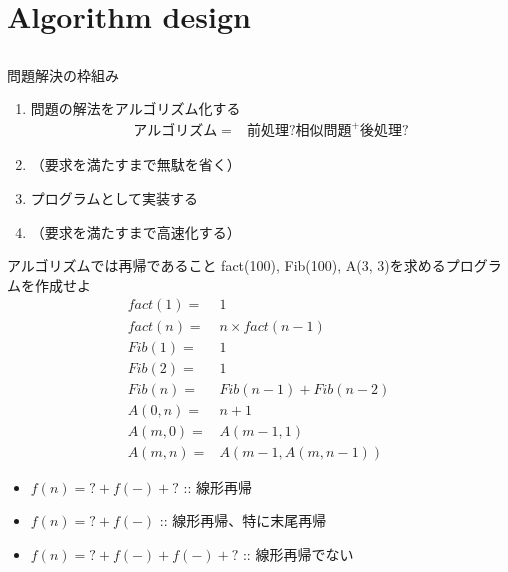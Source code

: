 \documentclass{beamer}
\subtitle{練習問題}
\begin{document}
\begin{frame}[fragile]{}
\titlepage
\end{frame}

\section{Algorithm design}		%
\subsection{}

\begin{frame}[fragile]{問題解決の枠組み}{}
\begin{enumerate}\itemsep8pt
\item 問題の解法をアルゴリズム化する
\begin{align*}
アルゴリズム = & 前処理? 相似問題^{+} 後処理?
\end{align*}
\item （要求を満たすまで無駄を省く）
\item プログラムとして実装する
\item （要求を満たすまで高速化する）
\end{enumerate}
\end{frame}

\begin{frame}[fragile]{アルゴリズムでは再帰であること}{}
fact(100), Fib(100), A(3, 3)を求めるプログラムを作成せよ
\begin{align*}
fact(1) =& 1 \\
fact(n) =& n \times fact(n - 1)\\
Fib(1) =& 1 \\
Fib(2) =& 1 \\
Fib(n) =& Fib(n - 1) + Fib(n -2) \\
A(0, n) =& n + 1 \\
A(m, 0) =& A(m - 1, 1) \\
A(m, n) =& A(m - 1, A(m, n - 1))
\end{align*}

\begin{itemize}%
\item $f(n) = ? + f(-) + ?$ :: 線形再帰
\item $f(n) = ? + f(-)$ :: 線形再帰、特に末尾再帰\href{https://ja.wikipedia.org/wiki/%E6%9C%AB%E5%B0%BE%E5%86%8D%E5%B8%B0}{\beamergotobutton{wikipedia}}
\item $f(n) = ? + f(-) + f(-) + ?$ :: 線形再帰でない
\end{itemize}
\end{frame}
\end{document}
